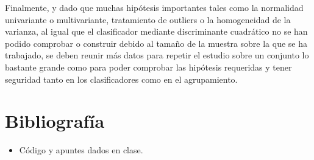 \documentclass[twoside,openright,titlepage,numbers=noenddot,openany,headinclude,footinclude=true,
cleardoublepage=empty,abstractoff,BCOR=5mm,paper=a4,fontsize=12pt,main=spanish]{scrreprt}
\begin{document}
Finalmente, y dado que muchas hipótesis importantes tales como la normalidad univariante o multivariante, tratamiento de outliers o la homogeneidad de la varianza, al igual que el clasificador mediante discriminante cuadrático no se han podido comprobar o construir debido al tamaño de la muestra sobre la que se ha trabajado, se deben reunir más datos para repetir el estudio sobre un conjunto lo bastante grande como para poder comprobar las hipótesis requeridas y tener seguridad tanto en los clasificadores como en el agrupamiento.



%
\newpage


\chapter{Bibliografía}

\begin{itemize}
\item Código y apuntes dados en clase.
\end{itemize}

%
\end{document}
